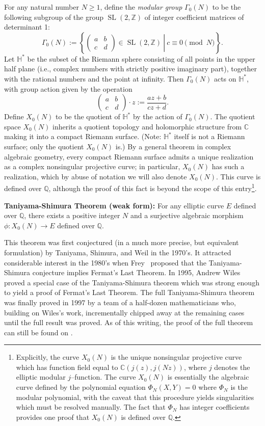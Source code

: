 \documentclass{article}
\newcommand{\SL}{\operatorname{SL}}
\newcommand{\Z}{{\mathbb{Z}}}
\renewcommand{\H}{{\mathbb{H}}}
\newcommand{\C}{{\mathbb{C}}}
\newcommand{\Q}{{\mathbb{Q}}}
\begin{document}
For any natural number $N \geq 1$, define the {\em modular group}
$\Gamma_0(N)$ to be the following subgroup of the group $\SL(2,\Z)$ of
integer coefficient matrices of determinant 1:
$$
\Gamma_0(N) := \left\{ \left. \begin{pmatrix} a & b \\ c & d
\end{pmatrix} \in \SL(2,\Z)\ \right|\ c \equiv 0 \pmod{N} \right\}.
$$
Let $\H^*$ be the subset of the Riemann sphere consisting of all
points in the upper half plane (i.e., complex numbers with strictly
positive imaginary part), together with the rational numbers and the
point at infinity. Then $\Gamma_0(N)$ acts on $\H^*$, with group
action given by the operation
$$
\begin{pmatrix} a & b \\ c & d \end{pmatrix} \cdot z := \frac{az+b}{cz+d}.
$$
Define $X_0(N)$ to be the quotient of $\H^*$ by the action of
$\Gamma_0(N)$. The quotient space $X_0(N)$ inherits a quotient
topology and holomorphic structure from $\C$ making it into a compact
Riemann surface. (Note: $\H^*$ itself is not a Riemann surface; only
the quotient $X_0(N)$ is.) By a general theorem in complex algebraic
geometry, every compact Riemann surface admits a unique realization as
a complex nonsingular projective curve; in particular, $X_0(N)$ has
such a realization, which by abuse of notation we will also denote
$X_0(N)$. This curve is defined over $\Q$, although the proof of this
fact is beyond the scope of this entry\footnote{Explicitly, the curve
$X_0(N)$ is the unique nonsingular projective curve which has function
field equal to $\C(j(z), j(Nz))$, where $j$ denotes the elliptic
modular $j$--function. The curve $X_0(N)$ is essentially the algebraic
curve defined by the polynomial equation $\Phi_N(X,Y) = 0$ where
$\Phi_N$ is the modular polynomial, with the caveat that this
procedure yields singularities which must be resolved manually. The
fact that $\Phi_N$ has integer coefficients provides one proof that
$X_0(N)$ is defined over $\Q$.}.

{\bf Taniyama-Shimura Theorem (weak form):} For any elliptic curve $E$ defined
over $\mathbb{Q}$, there exists a positive integer $N$ and a
surjective algebraic morphism $\phi: X_0(N) \to E$ defined over
$\mathbb{Q}$.

This theorem was first conjectured (in a much more precise, but equivalent formulation) by Taniyama, Shimura, and Weil in
the 1970's. It attracted considerable interest in the 1980's when
Frey~\cite{frey} proposed that the Taniyama-Shimura conjecture implies
Fermat's Last Theorem. In 1995, Andrew Wiles~\cite{wiles} proved a
special case of the Taniyama-Shimura theorem which was strong enough
to yield a proof of Fermat's Last Theorem. The full Taniyama-Shimura
theorem was finally proved in 1997 by a team of a half-dozen
mathematicians who, building on Wiles's work, incrementally chipped
away at the remaining cases until the full result was proved. As of this writing, the proof of the full theorem can still be found on .
\end{document}

